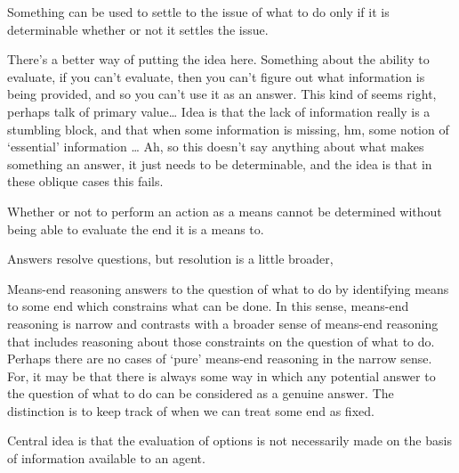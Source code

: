 \documentclass[10pt]{article}
\begin{document}
\begin{principle}
  Something can be used to settle to the issue of what to do only if it is determinable whether or not it settles the issue.
\end{principle}
There's a better way of putting the idea here.
Something about the ability to evaluate, if you can't evaluate, then you can't figure out what information is being provided, and so you can't use it as an answer.
This kind of seems right, perhaps talk of primary value\dots
Idea is that the lack of information really is a stumbling block, and that when some information is missing, hm, some notion of `essential' information \dots
Ah, so this doesn't say anything about what makes something an answer, it just needs to be determinable, and the idea is that in these oblique cases this fails.

\begin{principle}
  Whether or not to perform an action as a means cannot be determined without being able to evaluate the end it is a means to.
\end{principle}

Answers resolve questions, but resolution is a little broader,













\newpage



Means-end reasoning answers to the question of what to do by identifying means to some end which constrains what can be done.
In this sense, means-end reasoning is narrow and contrasts with a broader sense of means-end reasoning that includes reasoning about those constraints on the question of what to do.
Perhaps there are no cases of `pure' means-end reasoning in the narrow sense.
For, it may be that there is always some way in which any potential answer to the question of what to do can be considered as a genuine answer.
The distinction is to keep track of when we can treat some end as fixed.













\newpage

Central idea is that the evaluation of options is not necessarily made on the basis of information available to an agent.
\end{document}
